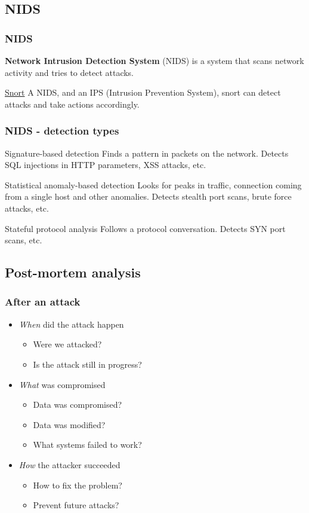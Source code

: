 \subsection{NIDS}

\begin{frame}
\frametitle{NIDS}
\textbf{Network Intrusion Detection System} (NIDS) is a system that scans
network activity and tries to detect attacks.
\begin{exampleblock}{\href{http://www.snort.org/}{Snort}}
A NIDS, and an IPS (Intrusion Prevention System), snort can detect attacks and
take actions accordingly.
\end{exampleblock}
\end{frame}

\begin{frame}
\frametitle{NIDS - detection types}
\begin{block}{Signature-based detection}
Finds a pattern in packets on the network.
Detects SQL injections in HTTP parameters, XSS attacks, etc.
\end{block}
\begin{block}{Statistical anomaly-based detection}
Looks for peaks in traffic, connection coming from a single host and other
anomalies.
Detects stealth port scans, brute force attacks, etc.
\end{block}
\begin{block}{Stateful protocol analysis}
Follows a protocol conversation.
Detects SYN port scans, etc.
\end{block}
\end{frame}

\subsection{Post-mortem analysis}

\begin{frame}
\frametitle{After an attack}
\begin{itemize}
\item \emph{When} did the attack happen
	\begin{itemize}
	\item Were we attacked?
	\item Is the attack still in progress?
	\end{itemize}
\item \emph{What} was compromised
	\begin{itemize}
	\item Data was compromised?
	\item Data was modified?
	\item What systems failed to work?
	\end{itemize}
\item \emph{How} the attacker succeeded
	\begin{itemize}
	\item How to fix the problem?
	\item Prevent future attacks?
	\end{itemize}
\end{itemize}
\end{frame}

